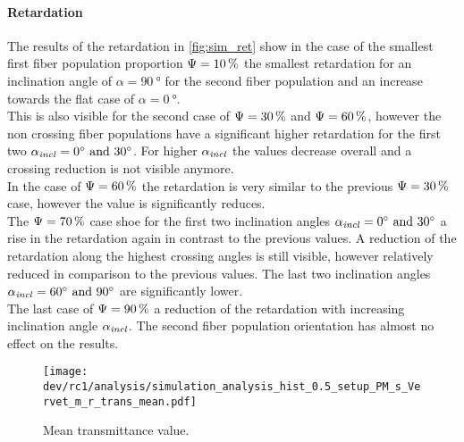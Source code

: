 \paragraph{Retardation}
The results of the retardation in \cref{fig:sim_ret} show in the case of the smallest first fiber population proportion $\textnormal{$\Psi$}=\SI{10}{\percent}$ the smallest retardation for an inclination angle of $\alpha=\SI{90}{\degree}$ for the second fiber population and an increase towards the flat case of $\alpha=\SI{0}{\degree}$.
\\
% 
This is also visible for the second case of $\textnormal{$\Psi$}=\SI{30}{\percent}$ and $\textnormal{$\Psi$}=\SI{60}{\percent}$, however the non crossing fiber populations have a significant higher retardation for the first two $\modelInc = \SIlist{0;30}{\degree}$.
For higher $\textnormal{$\alpha_{\mathit{incl}}$}$ the values decrease overall and a crossing reduction is not visible anymore.
\\
In the case of $\textnormal{$\Psi$}=\SI{60}{\percent}$ the retardation is very similar to the previous $\textnormal{$\Psi$}=\SI{30}{\percent}$ case, however the value is significantly reduces.
% 
\\
The $\textnormal{$\Psi$}=\SI{70}{\percent}$ case shoe for the first two inclination angles $\modelInc=\SIlist{0;30}{\degree}$ a rise in the retardation again in contrast to the previous values.
A reduction of the retardation along the highest crossing angles is still visible, however relatively reduced in comparison to the previous values.
The last two inclination angles $\modelInc=\SIlist{60;90}{\degree}$ are significantly lower.
\\
%
The last case of $\textnormal{$\Psi$}=\SI{90}{\percent}$ a reduction of the retardation with increasing inclination angle $\textnormal{$\alpha_{\mathit{incl}}$}$.
The second fiber population orientation has almost no effect on the results.
% 
% 
% 
\begin{figure}[!p]
\centering
\texttt{[image: dev/rc1/analysis/simulation\_analysis\_hist\_0.5\_setup\_PM\_s\_Vervet\_m\_r\_trans\_mean.pdf]}
\caption[Simulation transmittance]{Mean transmittance value.}
\label{fig:sim_ana_trans}
\end{figure}
% 
